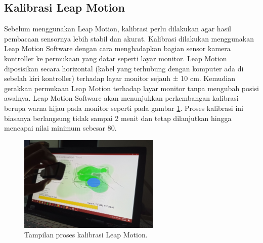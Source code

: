 	\subsection{Kalibrasi Leap Motion}
	\vspace{1ex}
		Sebelum menggunakan Leap Motion, kalibrasi perlu dilakukan agar hasil pembacaan sensornya lebih stabil dan akurat. Kalibrasi dilakukan menggunakan Leap Motion Software dengan cara menghadapkan bagian sensor kamera kontroller ke permukaan yang datar seperti layar monitor. Leap Motion diposisikan secara horizontal (kabel yang terhubung dengan komputer ada di sebelah kiri kontroller) terhadap layar monitor sejauh ± 10 cm. Kemudian gerakkan permukaan Leap Motion terhadap layar monitor tanpa mengubah posisi awalnya. Leap Motion Software akan menunjukkan perkembangan kalibrasi berupa warna hijau pada monitor seperti pada gambar \ref{fig:lm_kalibrasi}. Proses kalibrasi ini biasanya berlangsung tidak sampai 2 menit dan tetap dilanjutkan hingga mencapai nilai minimum sebesar 80.
		\begin{figure} [H]
			\includegraphics[width=0.6\textwidth]{img/bab3/lm_kalibrasi.jpg}
			\caption{Tampilan proses kalibrasi Leap Motion.}
			\label{fig:lm_kalibrasi}
		\end{figure}
		\vspace{-2ex}
		
